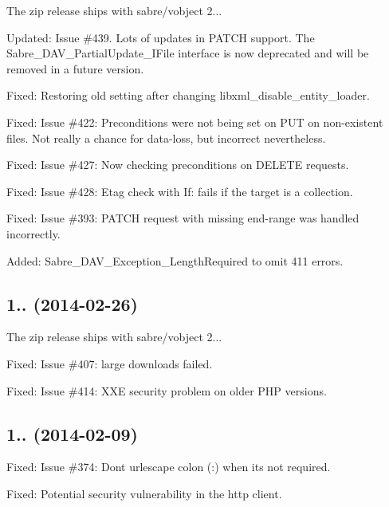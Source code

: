 \begin{DoxyItemize}
\item The zip release ships with sabre/vobject 2...
\item Updated\+: Issue \#439. Lots of updates in P\+A\+T\+CH support. The Sabre\+\_\+\+D\+A\+V\+\_\+\+Partial\+Update\+\_\+\+I\+File interface is now deprecated and will be removed in a future version.
\item Fixed\+: Restoring old setting after changing libxml\+\_\+disable\+\_\+entity\+\_\+loader.
\item Fixed\+: Issue \#422\+: Preconditions were not being set on P\+UT on non-\/existent files. Not really a chance for data-\/loss, but incorrect nevertheless.
\item Fixed\+: Issue \#427\+: Now checking preconditions on D\+E\+L\+E\+TE requests.
\item Fixed\+: Issue \#428\+: Etag check with If\+: fails if the target is a collection.
\item Fixed\+: Issue \#393\+: P\+A\+T\+CH request with missing end-\/range was handled incorrectly.
\item Added\+: Sabre\+\_\+\+D\+A\+V\+\_\+\+Exception\+\_\+\+Length\+Required to omit 411 errors.
\end{DoxyItemize}

\subsection*{1.. (2014-\/02-\/26) }


\begin{DoxyItemize}
\item The zip release ships with sabre/vobject 2...
\item Fixed\+: Issue \#407\+: large downloads failed.
\item Fixed\+: Issue \#414\+: X\+XE security problem on older P\+HP versions.
\end{DoxyItemize}

\subsection*{1.. (2014-\/02-\/09) }


\begin{DoxyItemize}
\item Fixed\+: Issue \#374\+: Don\textquotesingle{}t urlescape colon (\+:) when it\textquotesingle{}s not required.
\item Fixed\+: Potential security vulnerability in the http client.
\end{DoxyItemize}

